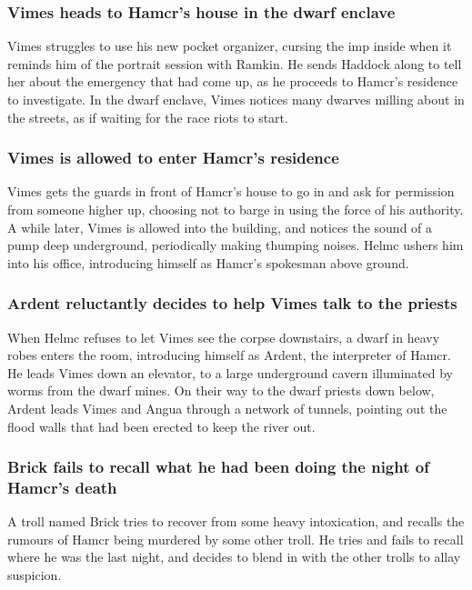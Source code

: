 \subsubsection{\Gls{Vimes} heads to \Gls{Hamcr}'s house in the dwarf enclave}
\Gls{Vimes} struggles to use his new pocket organizer, cursing the imp inside when it reminds him
of the portrait session with \Gls{Ramkin}. He sends \Gls{Haddock} along to tell her about the
emergency that had come up, as he proceeds to \Gls{Hamcr}'s residence to investigate. In the
dwarf enclave, \Gls{Vimes} notices many dwarves milling about in the streets, as if waiting for the
race riots to start.

\subsubsection{\Gls{Vimes} is allowed to enter \Gls{Hamcr}'s residence}
\Gls{Vimes} gets the guards in front of \Gls{Hamcr}'s house to go in and ask for permission from
someone higher up, choosing not to barge in using the force of his authority. A while later,
\Gls{Vimes} is allowed into the building, and notices the sound of a pump deep underground,
periodically making thumping noises. \Gls{Helmc} ushers him into his office, introducing himself
as \Gls{Hamcr}'s spokesman above ground.

\subsubsection{\Gls{Ardent} reluctantly decides to help \Gls{Vimes} talk to the priests}
When \Gls{Helmc} refuses to let \Gls{Vimes} see the corpse downstairs, a dwarf in heavy robes
enters the room, introducing himself as \Gls{Ardent}, the interpreter of \Gls{Hamcr}. He leads
\Gls{Vimes} down an elevator, to a large underground cavern illuminated by worms from the dwarf
mines. On their way to the dwarf priests down below, \Gls{Ardent} leads \Gls{Vimes} and \Gls{Angua}
through a network of tunnels, pointing out the flood walls that had been erected to keep the river
out.

\subsubsection{\Gls{Brick} fails to recall what he had been doing the night of \Gls{Hamcr}'s death}
A troll named \Gls{Brick} tries to recover from some heavy intoxication, and recalls the rumours
of \Gls{Hamcr} being murdered by some other troll. He tries and fails to recall where he was the
last night, and decides to blend in with the other trolls to allay suspicion.


